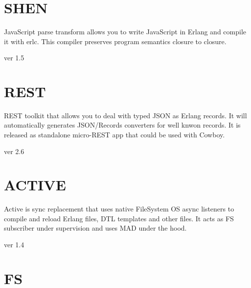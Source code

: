 \documentclass[11pt]{article}
\begin{document}
\section*{SHEN}
\paragraph{}    
JavaScript parse transform allows you to write JavaScript in Erlang and
compile it with erlc. This compiler preserves program semantics closure to closure.

 ver 1.5

\section*{REST}
\paragraph{}
REST toolkit that allows you to deal with typed JSON as Erlang records.
It will automatically generates JSON/Records converters for well knwon records.
It is released as standalone micro-REST app that could be used with Cowboy.

 ver 2.6


\section*{ACTIVE}
\paragraph{}
Active is sync replacement that uses native FileSystem OS async
listeners to compile and reload Erlang files, DTL templates and other files.
It acts as FS subscriber under supervision and uses MAD under the hood.

 ver 1.4

\section*{FS}
\end{document}
